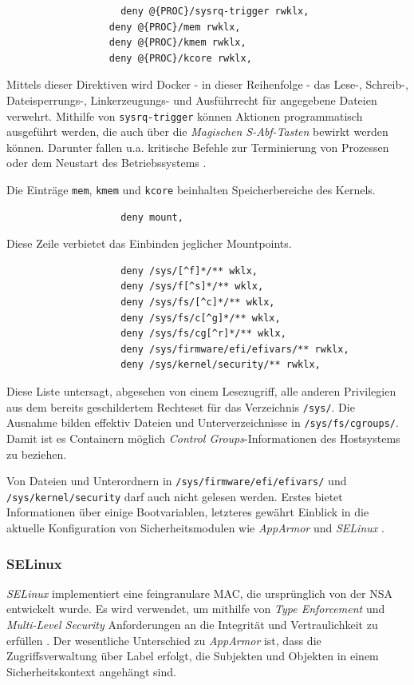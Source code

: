 \documentclass[../main.tex]{subfiles}
\begin{document}
				\begin{lstlisting}
					deny @{PROC}/sysrq-trigger rwklx,
				  deny @{PROC}/mem rwklx,
				  deny @{PROC}/kmem rwklx,
				  deny @{PROC}/kcore rwklx,
				\end{lstlisting}
				Mittels dieser Direktiven wird Docker - in dieser Reihenfolge - das Lese-, Schreib-, Dateisperrungs-, Linkerzeugungs- und Ausführrecht für angegebene Dateien verwehrt. Mithilfe von \texttt{sysrq-trigger} können Aktionen programmatisch ausgeführt werden, die auch über die \emph{Magischen S-Abf-Tasten} bewirkt werden können. Darunter fallen u.a. kritische Befehle zur Terminierung von Prozessen oder dem Neustart des Betriebssystems \cite{apparmorMagicSysRQ}\cite{apparmorSysrqTrigger}.

				Die Einträge \texttt{mem}, \texttt{kmem} und \texttt{kcore} beinhalten Speicherbereiche des Kernels.

				\begin{lstlisting}
					deny mount,
				\end{lstlisting}
				Diese Zeile verbietet das Einbinden jeglicher Mountpoints.

				\begin{lstlisting}
					deny /sys/[^f]*/** wklx,
					deny /sys/f[^s]*/** wklx,
					deny /sys/fs/[^c]*/** wklx,
					deny /sys/fs/c[^g]*/** wklx,
					deny /sys/fs/cg[^r]*/** wklx,
					deny /sys/firmware/efi/efivars/** rwklx,
					deny /sys/kernel/security/** rwklx,
				\end{lstlisting}
				Diese Liste untersagt, abgesehen von einem Lesezugriff, alle anderen Privilegien aus dem bereits geschildertem Rechteset für das Verzeichnis \texttt{/sys/}. Die Ausnahme bilden effektiv Dateien und Unterverzeichnisse in \texttt{/sys/fs/cgroups/}. Damit ist es Containern möglich \emph{Control Groups}-Informationen des Hostsystems zu beziehen.

				Von Dateien und Unterordnern in \texttt{/sys/firmware/efi/efivars/} und \texttt{/sys/kernel/security} darf auch nicht gelesen werden. Erstes bietet Informationen über einige Bootvariablen, letzteres gewährt Einblick in die aktuelle Konfiguration von Sicherheitsmodulen wie \emph{AppArmor} und \emph{SELinux} \cite{apparmorEFI}\cite{apparmorSecurityFS}\cite{apparmorLWNSecurityFS}.

  		\subsubsection{\acrshort{SELinux}}
				\emph{SELinux} implementiert eine feingranulare MAC, die ursprünglich von der NSA entwickelt wurde. Es wird verwendet, um mithilfe von \emph{Type Enforcement} und \emph{Multi-Level Security} Anforderungen an die Integrität und Vertraulichkeit zu erfüllen \cite{redhatSec}. %
				Der wesentliche Unterschied zu \emph{AppArmor} ist, dass die Zugriffsverwaltung über Label erfolgt, die Subjekten und Objekten in einem Sicherheitskontext angehängt sind.
\end{document}
